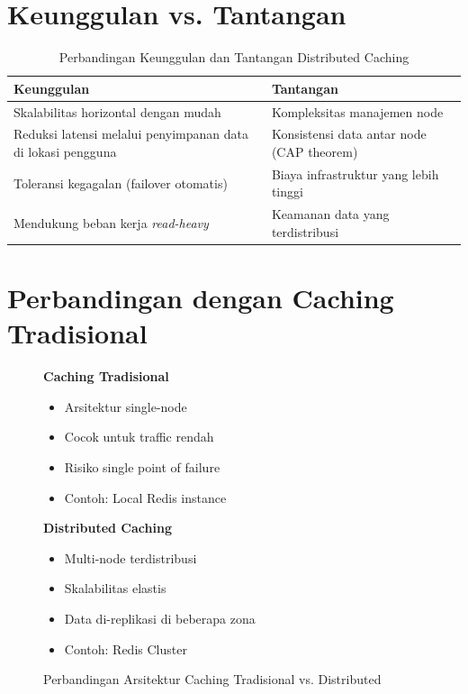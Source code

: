 \documentclass[11pt, a4paper]{book}
\begin{document}
	\section{Keunggulan vs. Tantangan}
	\label{sec:keunggulan-tantangan}
	
	\begin{table}[h]
		\centering
		\caption{Perbandingan Keunggulan dan Tantangan Distributed Caching}
		\label{tab:keunggulan-tantangan}
		\begin{tabularx}{\textwidth}{|X|X|}
			\hline
			\textbf{Keunggulan} & \textbf{Tantangan} \\ \hline
			Skalabilitas horizontal dengan mudah & Kompleksitas manajemen node \\ \hline
			Reduksi latensi melalui penyimpanan data di lokasi pengguna & Konsistensi data antar node (CAP theorem) \\ \hline
			Toleransi kegagalan (failover otomatis) & Biaya infrastruktur yang lebih tinggi \\ \hline
			Mendukung beban kerja \textit{read-heavy} & Keamanan data yang terdistribusi \\ \hline
		\end{tabularx}
	\end{table}
	
	\section{Perbandingan dengan Caching Tradisional}
	\label{sec:perbandingan-tradisional}
	
	\begin{figure}[htbp]
		\centering
		\begin{minipage}{0.45\textwidth}
			\centering
			\textbf{Caching Tradisional}
			\begin{itemize}
				\item Arsitektur single-node
				\item Cocok untuk traffic rendah
				\item Risiko single point of failure
				\item Contoh: Local Redis instance
			\end{itemize}
		\end{minipage}
		\hfill
		\begin{minipage}{0.45\textwidth}
			\centering
			\textbf{Distributed Caching}
			\begin{itemize}
				\item Multi-node terdistribusi
				\item Skalabilitas elastis
				\item Data di-replikasi di beberapa zona
				\item Contoh: Redis Cluster
			\end{itemize}
		\end{minipage}
		\caption{Perbandingan Arsitektur Caching Tradisional vs. Distributed}
		\label{fig:perbandingan-arsitektur}
	\end{figure}
	
\end{document}
